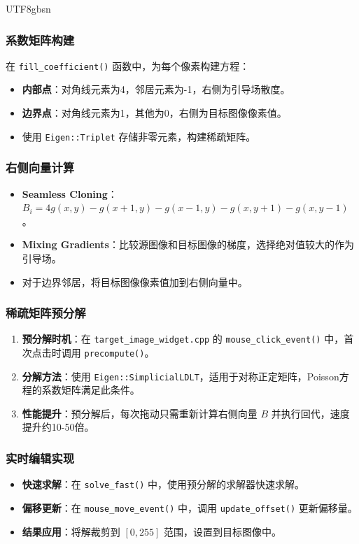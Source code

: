 \documentclass[11pt,a4paper]{article}
\begin{document}
\begin{CJK*}{UTF8}{gbsn}
\subsubsection{系数矩阵构建}
在 \texttt{fill\_coefficient()} 函数中，为每个像素构建方程：
\begin{itemize}
    \item \textbf{内部点}：对角线元素为4，邻居元素为-1，右侧为引导场散度。
    \item \textbf{边界点}：对角线元素为1，其他为0，右侧为目标图像像素值。
    \item 使用 \texttt{Eigen::Triplet} 存储非零元素，构建稀疏矩阵。
\end{itemize}

\subsubsection{右侧向量计算}
\begin{itemize}
    \item \textbf{Seamless Cloning}：$B_i = 4g(x,y) - g(x+1,y) - g(x-1,y) - g(x,y+1) - g(x,y-1)$。
    \item \textbf{Mixing Gradients}：比较源图像和目标图像的梯度，选择绝对值较大的作为引导场。
    \item 对于边界邻居，将目标图像像素值加到右侧向量中。
\end{itemize}

\subsubsection{稀疏矩阵预分解}
\begin{enumerate}
    \item \textbf{预分解时机}：在 \texttt{target\_image\_widget.cpp} 的 \texttt{mouse\_click\_event()} 中，首次点击时调用 \texttt{precompute()}。
    \item \textbf{分解方法}：使用 \texttt{Eigen::SimplicialLDLT}，适用于对称正定矩阵，Poisson方程的系数矩阵满足此条件。
    \item \textbf{性能提升}：预分解后，每次拖动只需重新计算右侧向量 $B$ 并执行回代，速度提升约10-50倍。
\end{enumerate}

\subsubsection{实时编辑实现}
\begin{itemize}
    \item \textbf{快速求解}：在 \texttt{solve\_fast()} 中，使用预分解的求解器快速求解。
    \item \textbf{偏移更新}：在 \texttt{mouse\_move\_event()} 中，调用 \texttt{update\_offset()} 更新偏移量。
    \item \textbf{结果应用}：将解裁剪到 $[0, 255]$ 范围，设置到目标图像中。
\end{itemize}


\end{CJK*}
\end{document}
